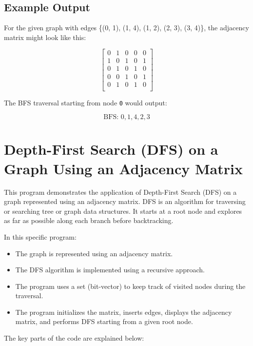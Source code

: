 \documentclass{book}
\begin{document}
\subsection{Example Output}

For the given graph with edges \{(0, 1), (1, 4), (1, 2), (2, 3), (3, 4)\}, the adjacency matrix might look like this:

\[
\begin{bmatrix}
0 & 1 & 0 & 0 & 0 \\
1 & 0 & 1 & 0 & 1 \\
0 & 1 & 0 & 1 & 0 \\
0 & 0 & 1 & 0 & 1 \\
0 & 1 & 0 & 1 & 0 \\
\end{bmatrix}
\]

The BFS traversal starting from node \texttt{0} would output:

\[
\text{BFS: } 0, 1, 4, 2, 3
\]

\section{Depth-First Search (DFS) on a Graph Using an Adjacency Matrix}

This program demonstrates the application of Depth-First Search (DFS) on a graph represented using an adjacency matrix. DFS is an algorithm for traversing or searching tree or graph data structures. It starts at a root node and explores as far as possible along each branch before backtracking.

In this specific program:
\begin{itemize}
    \item The graph is represented using an adjacency matrix.
    \item The DFS algorithm is implemented using a recursive approach.
    \item The program uses a set (bit-vector) to keep track of visited nodes during the traversal.
    \item The program initializes the matrix, inserts edges, displays the adjacency matrix, and performs DFS starting from a given root node.
\end{itemize}

The key parts of the code are explained below:
\end{document}
